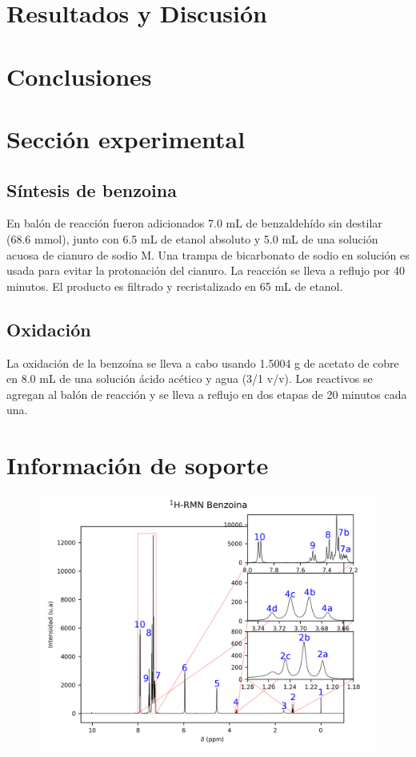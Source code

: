 \documentclass[fleqn,10pt]{SelfArx}
\begin{document}

\section{Resultados y Discusi\'on}
\section{Conclusiones}
\section{Secci\'on experimental}
\subsection{S\'intesis de benzoina}
En bal\'on de reacci\'on fueron adicionados 7.0 mL de benzaldeh\'ido sin destilar (68.6 mmol), junto con 6.5 mL de etanol absoluto y 5.0 mL de una soluci\'on acuosa de cianuro de sodio M. Una trampa de bicarbonato de sodio en soluci\'on es usada para evitar la protonaci\'on del cianuro. La reacci\'on se lleva a reflujo por 40 minutos. El producto es filtrado y recristalizado en 65 mL de etanol.


\subsection{Oxidaci\'on}
La oxidaci\'on de la benzo\'ina se lleva a cabo usando 1.5004 g de acetato de cobre en 8.0 mL de una soluci\'on \'acido ac\'etico y agua (3/1 v/v). Los reactivos se agregan al bal\'on de reacci\'on y se lleva a reflujo en dos etapas de 20 minutos cada una. 



\newpage
\onecolumn
\section{Informaci\'on de soporte}
\begin{figure}[ht]
	\includegraphics[width=\linewidth]{data/H-Benzoina-edited.png}
\end{figure}
\end{document}
